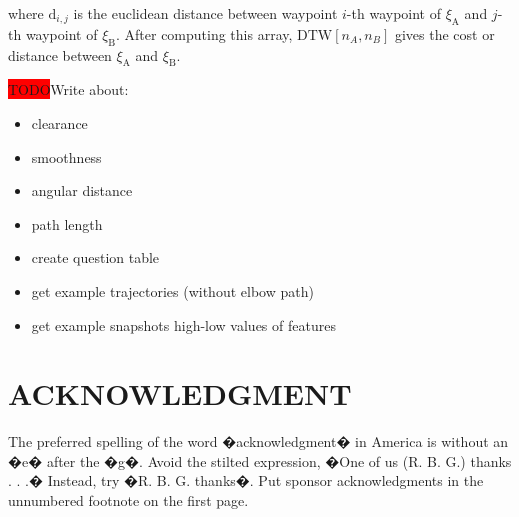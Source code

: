 \documentclass[letterpaper, 10 pt, conference]{ieeeconf}  %
\newcommand{\todo}{\colorbox{red}{TODO}}
\newcommand{\tj}[1]{\ensuremath{\xi_\text{#1}}}
\begin{document}
where $\text{d}_{i,j}$ is the euclidean distance between waypoint $i$-th waypoint of \tj{A} and $j$-th waypoint of \tj{B}. After computing this array, $\text{DTW}[n_A, n_B]$ gives the cost or distance between \tj{A} and \tj{B}.

\todo Write about:
\begin{itemize}
\item clearance
\item smoothness
\item angular distance
\item path length
\item create question table
\item get example trajectories (without elbow path)
\item get example snapshots high-low values of features
\end{itemize}

\addtolength{\textheight}{-12cm}   %







\section*{ACKNOWLEDGMENT}

The preferred spelling of the word �acknowledgment� in America is without an �e� after the �g�. Avoid the stilted expression, �One of us (R. B. G.) thanks . . .�  Instead, try �R. B. G. thanks�. Put sponsor acknowledgments in the unnumbered footnote on the first page.





\end{document}
